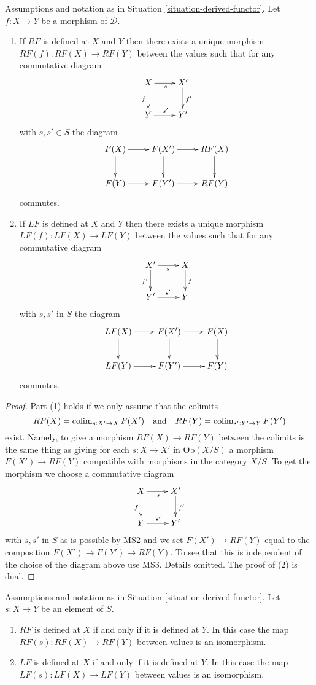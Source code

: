 \begin{lemma}
\label{lemma-derived-functor}
Assumptions and notation as in
Situation \ref{situation-derived-functor}.
Let $f : X \to Y$ be a morphism of $\mathcal{D}$.
\begin{enumerate}
\item If $RF$ is defined at $X$ and $Y$ then there exists a unique
morphism $RF(f) : RF(X) \to RF(Y)$ between the values such that
for any commutative diagram
$$
\xymatrix{
X \ar[d]_f \ar[r]_s & X' \ar[d]^{f'} \\
Y \ar[r]^{s'} & Y'
}
$$
with $s, s' \in S$ the diagram
$$
\xymatrix{
F(X) \ar[d] \ar[r] & F(X') \ar[d] \ar[r] & RF(X) \ar[d] \\
F(Y) \ar[r] & F(Y') \ar[r] & RF(Y)
}
$$
commutes.
\item If $LF$ is defined at $X$ and $Y$ then there exists a unique
morphism $LF(f) : LF(X) \to LF(Y)$ between the values such that
for any commutative diagram
$$
\xymatrix{
X' \ar[d]_{f'} \ar[r]_s & X \ar[d]^f \\
Y' \ar[r]^{s'} & Y
}
$$
with $s, s'$ in $S$ the diagram
$$
\xymatrix{
LF(X) \ar[d] \ar[r] & F(X') \ar[d] \ar[r] & F(X) \ar[d] \\
LF(Y) \ar[r] & F(Y') \ar[r] & F(Y)
}
$$
commutes.
\end{enumerate}
\end{lemma}

\begin{proof}
Part (1) holds if we only assume that the colimits
$$
RF(X) = \mathop{\rm colim}\nolimits_{s : X' \to X} F(X')
\quad\text{and}\quad
RF(Y) = \mathop{\rm colim}\nolimits_{s' : Y' \to Y} F(Y')
$$
exist. Namely, to give a morphism $RF(X) \to RF(Y)$ between the colimits
is the same thing as giving for each $s : X \to X'$ in $\text{Ob}(X/S)$
a morphism $F(X') \to RF(Y)$ compatible with morphisms in the category
$X/S$. To get the morphism we choose a commutative diagram
$$
\xymatrix{
X \ar[d]_f \ar[r]_s & X' \ar[d]^{f'} \\
Y \ar[r]^{s'} & Y'
}
$$
with $s, s'$ in $S$ as is possible by MS2 and we set
$F(X') \to RF(Y)$ equal to the composition $F(X') \to F(Y') \to RF(Y)$.
To see that this is independent of the choice of the diagram above use
MS3. Details omitted. The proof of (2) is dual.
\end{proof}

\begin{lemma}
\label{lemma-derived-inverts}
Assumptions and notation as in
Situation \ref{situation-derived-functor}.
Let $s : X \to Y$ be an element of $S$.
\begin{enumerate}
\item $RF$ is defined at $X$ if and only if it is defined at $Y$.
In this case the map $RF(s) : RF(X) \to RF(Y)$ between values
is an isomorphism.
\item $LF$ is defined at $X$ if and only if it is defined at $Y$.
In this case the map $LF(s) : LF(X) \to LF(Y)$ between values
is an isomorphism.
\end{enumerate}
\end{lemma}

